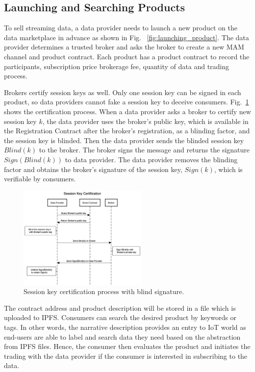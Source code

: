 \documentclass[conference]{IEEEtran}
\begin{document}
\subsection{Launching and Searching Products}
To sell streaming data, a data provider needs to launch a new product on the data marketplace in advance as shown in Fig.~ \ref{fig:launching_product}. The data provider determines a trusted broker and asks the broker to create a new MAM channel and product contract. Each product has a product contract to record the participants, subscription price brokerage fee, quantity of data and  trading process.

Brokers certify session keys as well. Only one session key can be signed in each product, so data providers cannot fake a session key to deceive consumers. Fig.~\ref{fig:key_certification} shows the certification process. When a data provider asks a broker to certify new session key $k$, the data provider uses the broker's public key, which is available in the Registration Contract after the broker's registration, as a blinding factor, and the session key is blinded. Then the data provider sends the blinded session key $Blind(k)$ to the broker. The broker signs the message and returns the signature $Sign(Blind(k))$ to data provider. The data provider removes the blinding factor and obtains the broker's signature of the session key, $Sign(k)$, which is verifiable by consumers.

\begin{figure}[!t]
    \centering
    \includegraphics[width=2.5in]{key_certification}
    \caption{Session key certification process with blind signature.}
    \label{fig:key_certification}
\end{figure}

The contract address and product description will be stored in a file which is uploaded to IPFS. Consumers can search the desired product by keywords or tags. In other words, the narrative description provides an entry to IoT world as end-users are able to label and search data they need based on the abstraction from IPFS files. Hence, the consumer then evaluates the product and initiates the trading with the data provider if the consumer is interested in subscribing to the data.
\end{document}
